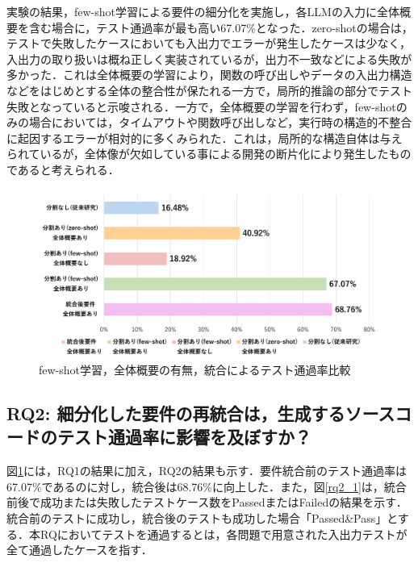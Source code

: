 \documentclass[submit,techrep,noauthor]{ipsj}
\begin{document}
実験の結果，few-shot学習による要件の細分化を実施し，各LLMの入力に全体概要を含む場合に，テスト通過率が最も高い67.07\%となった．zero-shotの場合は，テストで失敗したケースにおいても入出力でエラーが発生したケースは少なく，入出力の取り扱いは概ね正しく実装されているが，出力不一致などによる失敗が多かった．これは全体概要の学習により，関数の呼び出しやデータの入出力構造などをはじめとする全体の整合性が保たれる一方で，局所的推論の部分でテスト失敗となっていると示唆される．一方で，全体概要の学習を行わず，few-shotのみの場合においては，タイムアウトや関数呼び出しなど，実行時の構造的不整合に起因するエラーが相対的に多くみられた．これは，局所的な構造自体は与えられているが，全体像が欠如している事による開発の断片化により発生したものであると考えられる．


\begin{figure}[t]
    \centering
    \includegraphics[width=1.0\linewidth]{./Toyoshima_fig/RQ1_and_RQ2.pdf}
    \caption{few-shot学習，全体概要の有無，統合によるテスト通過率比較}
    \label{ses2025}
\end{figure}

\subsection{RQ2: 細分化した要件の再統合は，生成するソースコードのテスト通過率に影響を及ぼすか？}

図\ref{ses2025}には，RQ1の結果に加え，RQ2の結果も示す．要件統合前のテスト通過率は67.07\%であるのに対し，統合後は68.76\%に向上した．また，図\ref{rq2_1}は，統合前後で成功または失敗したテストケース数をPassedまたはFailedの結果を示す．統合前のテストに成功し，統合後のテストも成功した場合「Passed\&Pass」とする．本RQにおいてテストを通過するとは，各問題で用意された入出力テストが全て通過したケースを指す．
\end{document}

